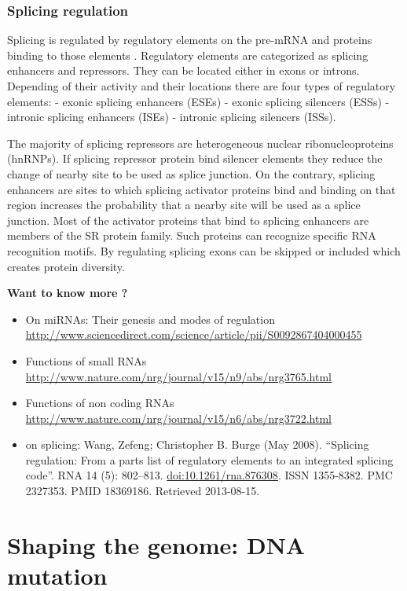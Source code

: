 \documentclass[12pt,]{krantz}
\let\BeginKnitrBlock\begin \let\EndKnitrBlock\end
\begin{document}
\hypertarget{splicing-regulation}{%
\subsubsection{Splicing regulation}\label{splicing-regulation}}

Splicing is regulated by regulatory elements on the pre-mRNA and proteins
binding to those elements . Regulatory elements are categorized
as splicing
enhancers and repressors. They can be located either in exons
or introns. Depending of their activity and their locations there are four types of regulatory elements:
- exonic splicing enhancers (ESEs)
- exonic splicing silencers (ESSs)
- intronic splicing enhancers (ISEs)
- intronic splicing silencers (ISSs).

The majority of splicing repressors are heterogeneous nuclear ribonucleoproteins (hnRNPs). If splicing repressor protein bind
silencer elements they reduce the change of nearby site to be
used as splice junction. On the contrary, splicing enhancers are sites to which splicing activator proteins bind and binding
on that region increases the probability that a nearby site will be used as a splice junction. Most of the activator proteins that bind to splicing enhancers are members of the SR protein family. Such proteins can recognize specific RNA recognition motifs. By regulating splicing exons can be skipped or included
which creates protein diversity.

\BeginKnitrBlock{rmdtip}
\textbf{Want to know more ?}

\begin{itemize}
\item
  On miRNAs: Their genesis and modes of regulation
  \url{http://www.sciencedirect.com/science/article/pii/S0092867404000455}
\item
  Functions of small RNAs
  \url{http://www.nature.com/nrg/journal/v15/n9/abs/nrg3765.html}
\item
  Functions of non coding RNAs
  \url{http://www.nature.com/nrg/journal/v15/n6/abs/nrg3722.html}
\item
  on splicing: Wang, Zefeng; Christopher B. Burge (May 2008). ``Splicing regulation: From a parts list of regulatory elements to an integrated splicing code''. RNA 14 (5): 802--813. \url{doi:10.1261/rna.876308}. ISSN 1355-8382. PMC 2327353. PMID 18369186. Retrieved 2013-08-15.
\end{itemize}
\EndKnitrBlock{rmdtip}

\hypertarget{shaping-the-genome-dna-mutation}{%
\section{Shaping the genome: DNA mutation}\label{shaping-the-genome-dna-mutation}}
\end{document}
